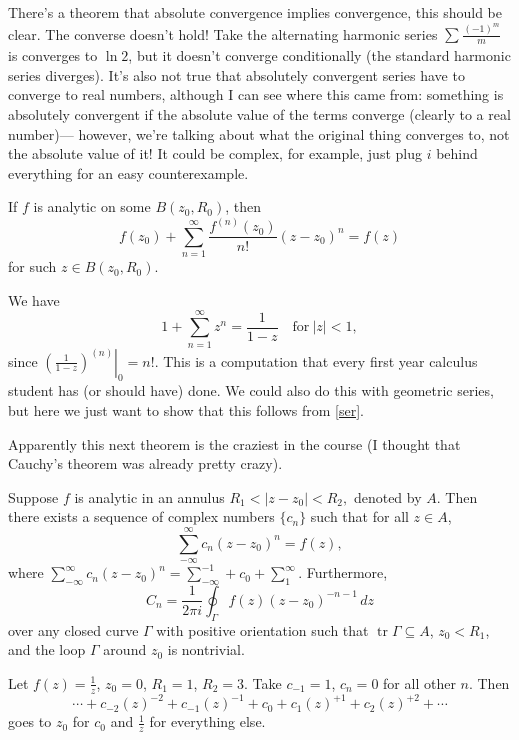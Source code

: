 There's a theorem that absolute convergence implies convergence, this should be clear. The converse doesn't hold! Take the alternating harmonic series $\sum_{}^{} \frac{(-1)^m}{m}$ is converges to $\ln 2$, but it doesn't converge conditionally (the standard harmonic series diverges). It's also not true that absolutely convergent series have to converge to real numbers, although I can see where this came from: something is absolutely convergent if the absolute value of the terms converge (clearly to a real number)— however, we're talking about what the original thing converges to, not the absolute value of it! It could be complex, for example, just plug $i$ behind everything for an easy counterexample.
\begin{theorem}\label{ser}
    If $f$ is analytic on some $B(z_0,R_0)$, then \[
        f(z_0)+ \sum_{n=1}^{\infty} \frac{f^{(n)}(z_0)}{n!}(z-z_0)^{n}=f(z)
    \] for such $z\in B(z_0,R_0).$
\end{theorem}
\begin{example}
    We have \[
        1+\sum_{n=1}^{\infty} z^n =\frac{1}{1-z}\quad \text{for} \ |z|<1,
    \] since $\left. \left( \frac{1}{1-z} \right) ^{(n)} \right|_0=n! $. This is a computation that every first year calculus student has (or should have) done. We could also do this with geometric series, but here we just want to show that this follows from \cref{ser}.
\end{example}

Apparently this next theorem is the craziest in the course (I thought that Cauchy's theorem was already pretty crazy).
\begin{theorem}\label{laurent}
Suppose $f$ is analytic in an annulus $R_1<|z-z_0|<R_2,$ denoted by $A$. Then there exists a sequence of complex numbers $\{c_n \} $ such that for all $z\in A$, \[
    \sum_{-\infty}^{\infty} c_n (z-z_0)^n =f(z),
\] where $\sum_{-\infty}^{\infty} c_n (z-z_0)^n=\sum_{-\infty}^{-1} +c_0+\sum_{1}^{\infty} .$ Furthermore, \[
C_n =\frac{1}{2\pi i}\oint_{\Gamma }^{} f(z)(z-z_0)^{-n-1} \, dz
\] over any closed curve $\Gamma $ with positive orientation such that $\operatorname{tr}\Gamma \subseteq A$, $z_0<R_1$, and the loop $\Gamma $ around $z_0$ is nontrivial.
\end{theorem}
\begin{example}
    Let $f(z)=\frac{1}{z}$, $z_0=0$, $R_1=1$, $R_2=3$. Take $c_{-1}=1$, $c_n =0$ for all other $n$. Then \[
        \cdots +c_{-2}(z)^{-2}+c_{-1}(z)^{-1}+c_0+c_1(z)^{+1}+c_2(z)^{+2}+\cdots 
    \] goes to $z_0$ for $c_0$ and $\frac{1}{z}$ for everything else.
\end{example}



